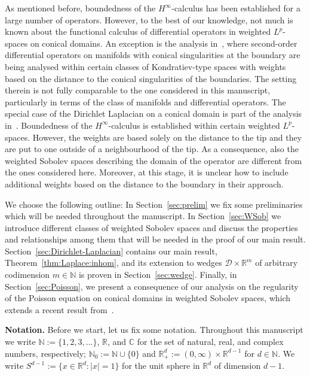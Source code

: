 \documentclass[12pt,a4paper, reqno]{amsart}
\theoremstyle{plain}
\theoremstyle{definition}
\theoremstyle{remark}
\numberwithin{equation}{section}
\newcommand{\1}{\mathbbm{1}}
\newcommand{\R}{\ensuremath{\mathbb{R}}}
\newcommand{\N}{\ensuremath{\mathbb{N}}}
\newcommand{\C}{\ensuremath{\mathbb{C}}}
\newcommand{\calD}{\ensuremath{\mathcal{D}}}
\begin{document}
As mentioned before, boundedness of the $H^\infty$-calculus has been established for a large number of operators. 
However, to the best of our knowledge, not much is known about the functional calculus of differential operators in weighted $L^p$-spaces on conical domains.
An exception is the analysis in~\cite{CoriascoSchroheSeiler2007,RoidosSchroheSeiler2021}, where second-order differential operators on manifolds with conical singularities at the boundary are being analysed within certain classes of Kondratiev-type spaces with weights based on the distance to the conical singularities of the boundaries.
The setting therein is not fully comparable to the one considered in this manuscript, particularly in terms of the class of manifolds and differential operators.
The special case of the Dirichlet Laplacian on a conical domain is part of the analysis in~\cite{CoriascoSchroheSeiler2007,RoidosSchroheSeiler2021}. Boundedness of the $H^\infty$-calculus is established within certain weighted $L^p$-spaces. However, the weights are based solely on the distance to the tip and they are put to one outside of a neighbourhood of the tip.
As a consequence, also the weighted Sobolev spaces describing the domain of the operator are different from the ones considered here. 
Moreover, at this stage, it is unclear how to include additional weights based on the distance to the boundary in their approach.

\medskip

We choose the following outline: In Section~\ref{sec:prelim} we fix some preliminaries which will be needed throughout the manuscript. In Section~\ref{sec:WSob} we introduce different classes of weighted Sobolev spaces and discuss the properties and relationships among them that will be needed in the proof of our main result. Section~\ref{sec:Dirichlet-Laplacian} contains our main result, Theorem~\ref{thm:Laplace:inhom}, and its extension to wedges $\calD\times\R^m$ of arbitrary codimension $m\in\N$ is proven in Section~\ref{sec:wedge}. Finally, in Section~\ref{sec:Poisson}, we present a consequence of our analysis on the regularity of the Poisson equation on conical domains in weighted Sobolev spaces, which extends a recent result from~\cite{cioicalicht2024sobolevspacesmixedweights}.


\bigskip

\noindent\textbf{Notation.} Before we start, let us fix some notation.
Throughout this manuscript we write $\N:=\{1,2,3,\ldots\}$, $\R$, and $\C$ for the set of natural, real, and complex numbers, 
respectively; $\N_0:=\N\cup\{0\}$ and $\R^d_+:=(0,\infty)\times\R^{d-1}$ for $d\in\N$. 
 We write $S^{d-1}:=\{x\in \R^d\colon |x| =1\}$ for the unit sphere in $\R^d$ of dimension $d-1$.
 
\end{document}
